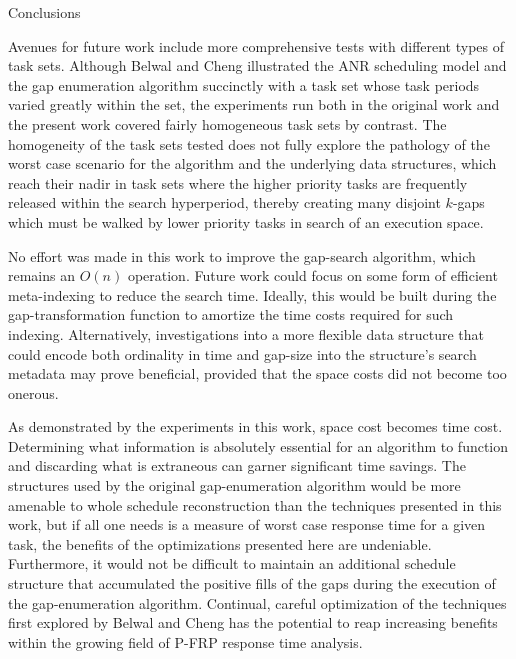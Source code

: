 \documentclass{article}
\begin{document}
\begin{section}{Conclusions}
  \begin{paragraph}{}
    Avenues for future work include more comprehensive tests with different types of task
    sets. Although Belwal and Cheng illustrated the ANR scheduling model and the gap
    enumeration algorithm succinctly with a task set whose task periods varied greatly
    within the set, the experiments run both in the original work and the present work
    covered fairly homogeneous task sets by contrast. The homogeneity of the task sets
    tested does not fully explore the pathology of the worst case scenario for the
    algorithm and the underlying data structures, which reach their nadir in task sets
    where the higher priority tasks are frequently released within the search hyperperiod,
    thereby creating many disjoint $k$-gaps which must be walked by lower priority tasks
    in search of an execution space.
  \end{paragraph}
  \begin{paragraph}{}
    No effort was made in this work to improve the gap-search algorithm, which remains
    an $O(n)$ operation. Future work could focus on some form of efficient meta-indexing
    to reduce the search time. Ideally, this would be built during the gap-transformation
    function to amortize the time costs required for such indexing.
    Alternatively, investigations into a more flexible data structure that could encode
    both ordinality in time and gap-size into the structure's search metadata may prove
    beneficial, provided that the space costs did not become too onerous.
  \end{paragraph}
  \begin{paragraph}{}
    As demonstrated by the experiments in this work, space cost becomes time cost.
    Determining what information is absolutely essential for an algorithm to function
    and discarding what is extraneous can garner significant time savings.
    The structures used by the original gap-enumeration algorithm would be more amenable
    to whole schedule reconstruction than the techniques presented in this work, but if
    all one needs is a measure of worst case response time for a given task, the benefits
    of the optimizations presented here are undeniable. Furthermore, it would not be
    difficult to maintain an additional schedule structure that accumulated the positive
    fills of the gaps during the execution of the gap-enumeration algorithm.
    Continual, careful optimization of the techniques first explored by Belwal and Cheng
    has the potential to reap increasing benefits within the growing field of
    P-FRP response time analysis.
  \end{paragraph}
\end{section}
\end{document}
